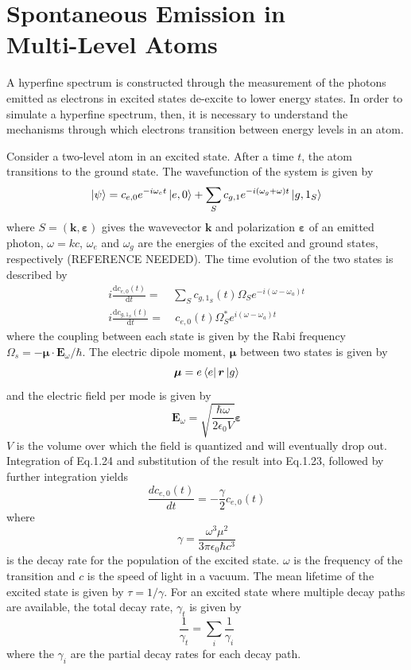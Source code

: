 \section{Spontaneous Emission in \\ Multi-Level Atoms}
\label{ALI}
A hyperfine spectrum is constructed through the measurement of the photons emitted as electrons in excited states de-excite to lower energy states. In order to simulate a hyperfine spectrum, then, it is necessary to understand the mechanisms through which electrons transition between energy levels in an atom.

Consider a two-level atom in an excited state. After a time $t$, the atom transitions to the ground state. The wavefunction of the system is given by
\begin{equation}
\ket{\psi} = c_{e,0}e^{-i\omega_et}\ket{e,0} + \sum_Sc_{g,1}e^{-i(\omega_g+\omega)t}\ket{g,1_S}
\end{equation}
where $S = (\bm{k},\bm{\varepsilon})$ gives the wavevector $\bm{k}$ and polarization $\bm{\varepsilon}$ of an emitted photon, $\omega = kc$, $\omega_e$ and $\omega_g$ are the energies of the excited and ground states, respectively (REFERENCE NEEDED). The time evolution of the two states is described by
\begin{align}
i\frac{\mathrm{d}c_{e,0}(t)}{\mathrm{d}t} =& \sum_Sc_{g,1_S}(t)\Omega_S e^{-i(\omega-\omega_a)t}\\
i\frac{\mathrm{d}c_{g,1_S}(t)}{\mathrm{d}t} =& \ c_{e,0}(t)\Omega_S^*e^{i(\omega-\omega_a)t}
\end{align}
where the coupling between each state is given by the Rabi frequency \\$\Omega_s = -\bm{\mu}\cdot\bm{E}_{\omega}/\hbar$. The electric dipole moment, $\bm{\mu}$ between two states is given by
\begin{equation}
\bm{\mu} = e\bra{e}\bm{r}\ket{g} 
\end{equation}
and the electric field per mode is given by
\begin{equation}
\bm{E}_{\omega} = \sqrt{\frac{\hbar\omega}{2\epsilon_0V}}\bm{\varepsilon}
\end{equation}
$V$ is the volume over which the field is quantized and will eventually drop out. Integration of Eq.1.24 and substitution of the result into Eq.1.23, followed by further integration yields 
\begin{equation}
\frac{d c_{e,0}(t)}{dt} = -\frac{\gamma}{2}c_{e,0}(t)
\end{equation}
where
\begin{equation}
\gamma = \frac{\omega^3\mu^2}{3\pi\epsilon_0\hbar c^3}
\label{gamma}
\end{equation}
is the decay rate for the population of the excited state. $\omega$ is the frequency of the transition and $c$ is the speed of light in a vacuum. The mean lifetime of the excited state is given by $\tau = 1/\gamma$. For an excited state where multiple decay paths are available, the total decay rate, $\gamma_t$ is given by
\begin{equation}
\frac{1}{\gamma_t} = \sum_i \frac{1}{\gamma_i}
\label{totdec}
\end{equation}
where the $\gamma_i$ are the partial decay rates for each decay path.


